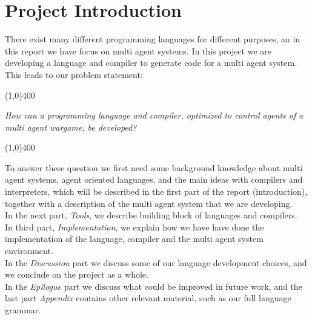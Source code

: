 \chapter*{Project Introduction}

There exist many different programming languages for different purposes, an in this report we have focus on multi agent systems. In this project we are developing a language and compiler to generate code for a multi agent system. This leads to our problem statement:
\begin{center}
\line(1,0){400}
\end{center}
	\textit{How can a programming language and compiler, optimized to control agents of a multi agent wargame, be developed?}
\begin{center}
\line(1,0){400}
\end{center}
To answer these question we first need some background knowledge about multi agent systems, agent oriented languages, and the main ideas with compilers and interpreters, which will be described in the first part of the report (introduction), together with a description of the multi agent system that we are developing.\\ \indent
In the next part, \textit{Tools}, we describe building block of languages and compilers.\\ \indent
In third part, \textit{Implementation}, we explain how we have have done the implementation of the language, compiler and the multi agent system environment.\\ \indent
In the \textit{Discussion} part we discuss some of our language development choices, and we conclude on the project as a whole.\\ \indent
In the \textit{Epilogue} part we discuss what could be improved in future work, and the last part \textit{Appendix} contains other relevant material, such as our full language grammar.